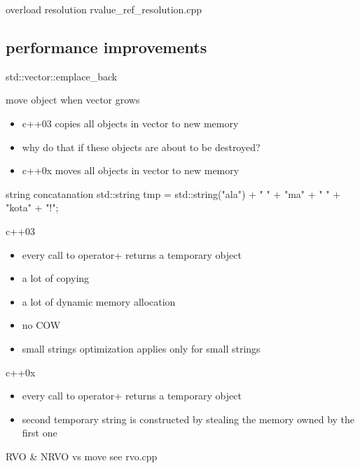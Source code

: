 \documentclass{beamer}
\begin{document}
\begin{frame}{overload resolution}
  rvalue\_ref\_resolution.cpp
\end{frame}

\subsection{performance improvements}
\begin{frame}{std::vector::emplace\_back}
  \begin{block}{move object when vector grows}
    \begin{itemize}
    \item c++03 copies all objects in vector to new memory
    \item why do that if these objects are about to be destroyed?
    \item c++0x moves all objects in vector to new memory
    \end{itemize}
  \end{block}
\end{frame}

\begin{frame}{string concatanation}
  std::string tmp = std::string("ala") + " " + "ma" + " " + "kota" + "!";
  \begin{block}{c++03}
    \begin{itemize}
    \item every call to operator+ returns a temporary object
    \item a lot of copying
    \item a lot of dynamic memory allocation
    \item no COW
    \item small strings optimization applies only for small strings
    \end{itemize}
  \end{block}

  \begin{block}{c++0x}
    \begin{itemize}
    \item every call to operator+ returns a temporary object
    \item second temporary string is constructed by stealing the memory owned by the first one
    \end{itemize}
  \end{block}
\end{frame}

\begin{frame}{RVO & NRVO vs move}
  see rvo.cpp
\end{frame}
\end{document}
